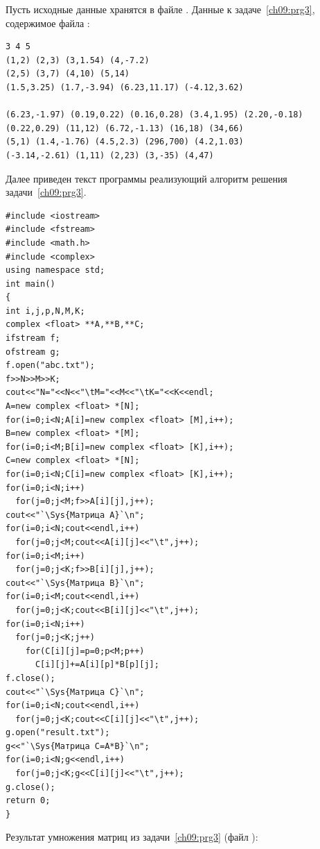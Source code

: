 Пусть исходные данные хранятся в файле . %
Данные к задаче~\ref{ch09:prg3}\label{ch09:file0}, содержимое файла :
\begin{verbatim}
3 4 5
(1,2) (2,3) (3,1.54) (4,-7.2)
(2,5) (3,7) (4,10) (5,14)
(1.5,3.25) (1.7,-3.94) (6.23,11.17) (-4.12,3.62)

(6.23,-1.97) (0.19,0.22) (0.16,0.28) (3.4,1.95) (2.20,-0.18)
(0.22,0.29) (11,12) (6.72,-1.13) (16,18) (34,66)
(5,1) (1.4,-1.76) (4.5,2.3) (296,700) (4.2,1.03)
(-3.14,-2.61) (1,11) (2,23) (3,-35) (4,47)
\end{verbatim}


Далее приведен текст программы реализующий алгоритм решения задачи~\ref{ch09:prg3}. 
\begin{lstlisting}
#include <iostream>
#include <fstream>
#include <math.h>
#include <complex>
using namespace std;
int main()
{
int i,j,p,N,M,K;
complex <float> **A,**B,**C;
ifstream f;
ofstream g;
f.open("abc.txt");
f>>N>>M>>K;
cout<<"N="<<N<<"\tM="<<M<<"\tK="<<K<<endl;
A=new complex <float> *[N];
for(i=0;i<N;A[i]=new complex <float> [M],i++);
B=new complex <float> *[M];
for(i=0;i<M;B[i]=new complex <float> [K],i++);
C=new complex <float> *[N];
for(i=0;i<N;C[i]=new complex <float> [K],i++);
for(i=0;i<N;i++)
  for(j=0;j<M;f>>A[i][j],j++);
cout<<"`\Sys{Матрица A}`\n";
for(i=0;i<N;cout<<endl,i++)
  for(j=0;j<M;cout<<A[i][j]<<"\t",j++);
for(i=0;i<M;i++)
  for(j=0;j<K;f>>B[i][j],j++);
cout<<"`\Sys{Матрица B}`\n";
for(i=0;i<M;cout<<endl,i++)
  for(j=0;j<K;cout<<B[i][j]<<"\t",j++);
for(i=0;i<N;i++)
  for(j=0;j<K;j++)
    for(C[i][j]=p=0;p<M;p++)
      C[i][j]+=A[i][p]*B[p][j];
f.close();
cout<<"`\Sys{Матрица C}`\n";
for(i=0;i<N;cout<<endl,i++)
  for(j=0;j<K;cout<<C[i][j]<<"\t",j++);
g.open("result.txt");
g<<"`\Sys{Матрица C=A*B}`\n";
for(i=0;i<N;g<<endl,i++)
  for(j=0;j<K;g<<C[i][j]<<"\t",j++);
g.close();
return 0;
}
\end{lstlisting}

Результат умножения матриц из задачи~\ref{ch09:prg3} (файл ):

